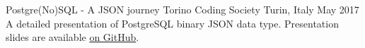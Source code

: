 

\begin{cventries}

  \cventry
  {Postgre(No)SQL - A JSON journey} %
  {Torino Coding Society} %
  {Turin, Italy} %
  {May 2017} %
  {
    A detailed presentation of PostgreSQL binary JSON data type. Presentation slides are available \href{https://github.com/nicola88/tcs-postgrenosql-talk}{on GitHub}.
  }

\end{cventries}

